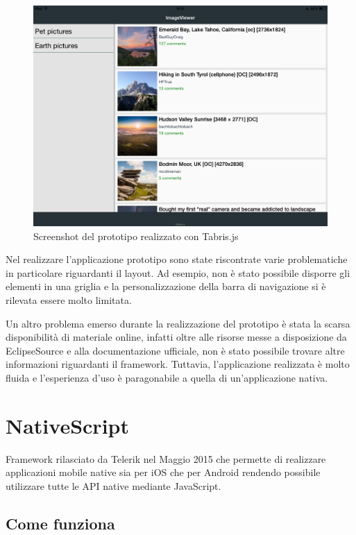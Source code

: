 \begin{figure}[htp]
\centering
\includegraphics[width=\textwidth]{../immagini/prototipo-tabris}
\caption{Screenshot del prototipo realizzato con Tabris.js}  
\end{figure}

Nel realizzare l'applicazione prototipo sono state riscontrate varie problematiche in particolare riguardanti il layout.
Ad esempio, non è stato possibile disporre gli elementi in una griglia e la personalizzazione della barra di navigazione si è rilevata essere molto limitata.

Un altro problema emerso durante la realizzazione del prototipo è stata la scarsa disponibilità di materiale online, infatti oltre alle risorse messe a disposizione da EclipseSource e alla documentazione ufficiale, non è stato possibile trovare altre informazioni riguardanti il framework.
Tuttavia, l'applicazione realizzata è molto fluida e l'esperienza d'uso è paragonabile a quella di un'applicazione nativa.

\FloatBarrier
\section{NativeScript}

Framework rilasciato da Telerik nel Maggio 2015 che permette di realizzare applicazioni mobile native sia per iOS che per Android rendendo possibile utilizzare tutte le API native mediante JavaScript.

\subsection{Come funziona}

